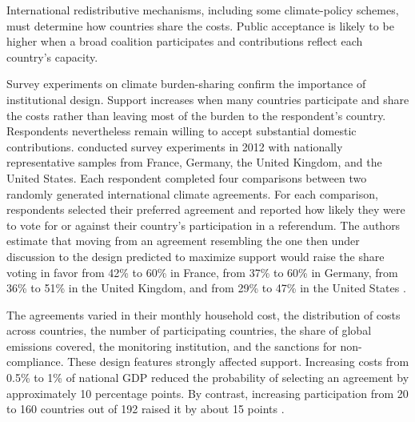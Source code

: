 
International redistributive mechanisms, including some climate-policy schemes, must determine how countries share the costs. Public acceptance is likely to be higher when a broad coalition participates and contributions reflect each country's capacity.

Survey experiments on climate burden-sharing confirm the importance of institutional design. Support increases when many countries participate and share the costs rather than leaving most of the burden to the respondent's country. Respondents nevertheless remain willing to accept substantial domestic contributions. \citet{bechtel_mass_2013} conducted survey experiments in 2012 with nationally representative samples from France, Germany, the United Kingdom, and the United States. Each respondent completed four comparisons between two randomly generated international climate agreements. For each comparison, respondents selected their preferred agreement and reported how likely they were to vote for or against their country's participation in a referendum. The authors estimate that moving from an agreement resembling the one then under discussion to the design predicted to maximize support would raise the share voting in favor from 42\% to 60\% in France, from 37\% to 60\% in Germany, from 36\% to 51\% in the United Kingdom, and from 29\% to 47\% in the United States \citep[Table S3]{bechtel_mass_2013}.


The agreements varied in their monthly household cost, the distribution of costs across countries, the number of participating countries, the share of global emissions covered, the monitoring institution, and the sanctions for non-compliance. These design features strongly affected support. Increasing costs from 0.5\% to 1\% of national GDP reduced the probability of selecting an agreement by approximately 10 percentage points. By contrast, increasing participation from 20 to 160 countries out of 192 raised it by about 15 points \citep[Table 1 \& Figure 2]{bechtel_mass_2013}.

